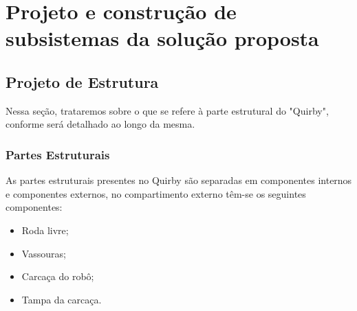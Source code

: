 \chapter{Projeto e construção de subsistemas da solução proposta}

\section{Projeto de Estrutura}
Nessa seção, trataremos sobre  o que se refere à parte estrutural do "Quirby", conforme será detalhado ao longo da mesma.

\subsection{Partes Estruturais}
As partes estruturais presentes no Quirby são separadas em componentes internos e componentes externos, no compartimento externo têm-se os seguintes componentes:

\begin{itemize}
    \item{Roda livre;}                                      
    \item{Vassouras;}
    \item{Carcaça do robô;}
    \item{Tampa da carcaça.}
\end{itemize}

